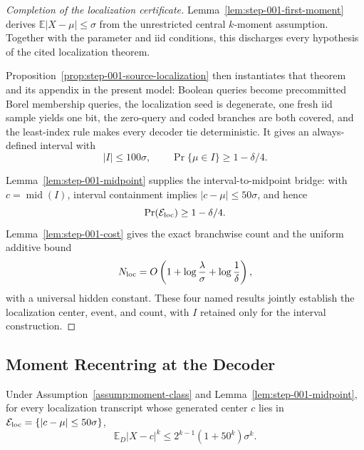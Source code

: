 \begin{proof}[Completion of the localization certificate]
Lemma~\ref{lem:step-001-first-moment} derives \(\mathbb E|X-\mu|\leq\sigma\) from the unrestricted central \(k\)-moment assumption. Together with the parameter and iid conditions, this discharges every hypothesis of the cited localization theorem.

Proposition~\ref{prop:step-001-source-localization} then instantiates that theorem and its appendix in the present model: Boolean queries become precommitted Borel membership queries, the localization seed is degenerate, one fresh iid sample yields one bit, the zero-query and coded branches are both covered, and the least-index rule makes every decoder tie deterministic. It gives an always-defined interval with
\[
|I|\leq100\sigma,
\qquad
\Pr\{\mu\in I\}\geq1-\delta/4.
\]

Lemma~\ref{lem:step-001-midpoint} supplies the interval-to-midpoint bridge: with \(c=\operatorname{mid}(I)\), interval containment implies \(|c-\mu|\leq50\sigma\), and hence
\[
\Pr(\mathcal E_{\rm loc})\geq1-\delta/4.
\]
Lemma~\ref{lem:step-001-cost} gives the exact branchwise count and the uniform additive bound
\[
N_{\rm loc}
=O\left(1+\log\frac\lambda\sigma+\log\frac1\delta\right),
\]
with a universal hidden constant. These four named results jointly establish the localization center, event, and count, with \(I\) retained only for the interval construction.
\end{proof}

\subsection{Moment Recentring at the Decoder}\label{app:step-002}

\begin{lemma}\label{lem:step-002-recentered-moment}
Under Assumption~\ref{assump:moment-class} and Lemma~\ref{lem:step-001-midpoint}, for every localization transcript whose
generated center \(c\) lies in
\(\mathcal E_{\rm loc}=\{\lvert c-\mu\rvert\leq50\sigma\}\),
\[
\mathbb E_D\lvert X-c\rvert^k
\leq 2^{k-1}(1+50^k)\sigma^k.
\]
\end{lemma}

